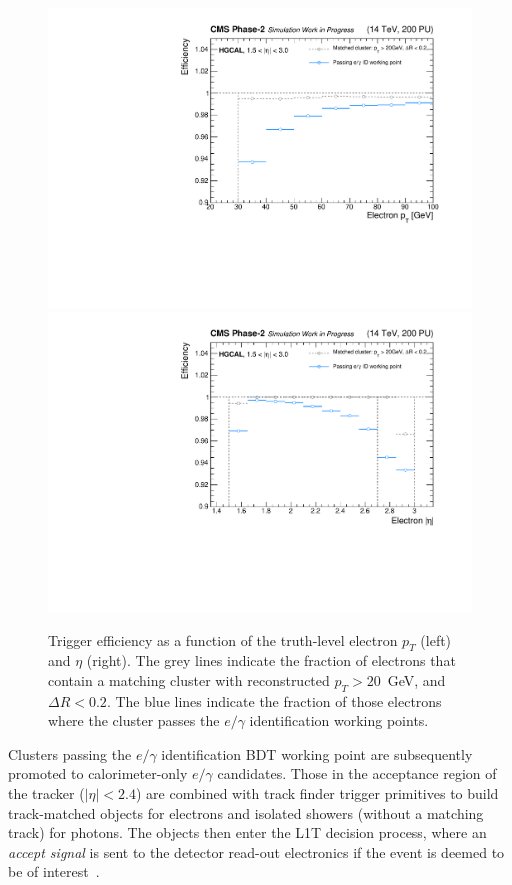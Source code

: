 \begin{figure}[htb!]
  \centering
  \includegraphics[width=.49\textwidth]{Figures/cms/egid/eff_vs_cl3d_gen_pt.pdf}
  \includegraphics[width=.49\textwidth]{Figures/cms/egid/eff_vs_cl3d_gen_eta.pdf}
  \caption[Efficiency of the $e/\gamma$ identification as a function of electron $p_T$ and $\eta$.]
  {
    Trigger efficiency as a function of the truth-level electron $p_T$ (left) and $\eta$ (right). The grey lines indicate the fraction of electrons that contain a matching cluster with reconstructed $p_T>20$~GeV, and $\Delta R<0.2$. The blue lines indicate the fraction of those electrons where the cluster passes the $e/\gamma$ identification working points.
  }
  \label{fig:egid_efficiency}
\end{figure}

Clusters passing the $e/\gamma$ identification BDT working point are subsequently promoted to calorimeter-only $e/\gamma$ candidates. 
Those in the acceptance region of the tracker (${|\eta|<2.4}$) are combined with track finder trigger primitives to build track-matched objects for electrons and isolated showers (without a matching track) for photons. The objects then enter the L1T decision process, where an \textit{accept signal} is sent to the detector read-out electronics if the event is deemed to be of interest~\cite{CERN-LHCC-2020-004}.

